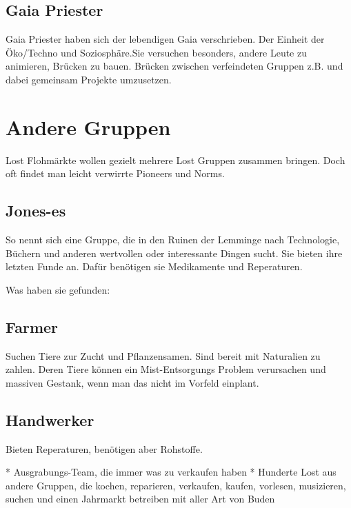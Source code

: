 \documentclass{book}
\begin{document}
\section{Gaia Priester}
Gaia Priester haben sich der lebendigen Gaia verschrieben. Der Einheit der Öko/Techno und Soziosphäre.Sie versuchen besonders, andere Leute zu animieren,  Brücken zu bauen. Brücken zwischen verfeindeten Gruppen z.B. und dabei gemeinsam Projekte umzusetzen.


\chapter{Andere Gruppen}

Lost Flohmärkte wollen gezielt mehrere Lost Gruppen zusammen bringen. Doch oft findet man leicht verwirrte Pioneers und Norms.

\section{Jones-es}

So nennt sich eine Gruppe, die in den Ruinen der Lemminge nach Technologie, Büchern und anderen wertvollen oder interessante Dingen sucht. Sie bieten ihre letzten Funde an. Dafür benötigen sie Medikamente und Reperaturen.

Was haben sie gefunden:

\section{Farmer}

Suchen Tiere zur Zucht und Pflanzensamen. Sind bereit mit Naturalien zu zahlen. Deren Tiere können ein Mist-Entsorgungs Problem verursachen und massiven Gestank, wenn man das nicht im Vorfeld einplant.

\section{Handwerker}

Bieten Reperaturen, benötigen aber Rohstoffe.


* Ausgrabungs-Team, die immer was zu verkaufen haben
* Hunderte Lost aus andere Gruppen, die kochen, reparieren, verkaufen, kaufen, vorlesen, musizieren, suchen und einen Jahrmarkt betreiben mit aller Art von Buden
\end{document}
